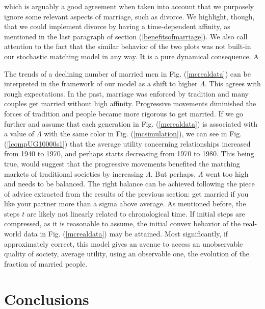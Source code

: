 \documentclass[12pt]{article}
\begin{document}
\noindent which is arguably a good agreement when taken into account that we purposely ignore some relevant aspects of marriage, such as divorce. We highlight, though, that we could implement divorce by having a time-dependent affinity, as mentioned in the last paragraph of section (\ref{benefitsofmarriage}). We also call attention to the fact that the similar behavior of the two plots was not built-in our stochastic matching model in any way. It is a pure dynamical consequence. A

The trends of a declining number of married men in Fig. (\ref{mcrealdata}) can be interpreted in the framework of our model as a shift to higher $\Lambda$. This agrees with rough expectations. In the past, marriage was enforced by tradition and many couples get married without high affinity. Progressive movements diminished the forces of tradition and people became more rigorous to get married. If we go further and assume that each generation in Fig. (\ref{mcrealdata}) is associated with a value of $\Lambda$ with the same color in Fig. (\ref{mcsimulation}), we can see in Fig. (\ref{lcompUG10000s1}) that the average utility concerning relationships increased from 1940 to 1970, and perhaps starts decreasing from 1970 to 1980. This being true, would suggest that the progressive movements benefited the matching markets of traditional societies by increasing $\Lambda$. But perhaps, $\Lambda$ went too high and needs to be balanced. The right balance can be achieved following the piece of advice extracted from the results of the previous section: get married if you like your partner more than a sigma above average. As mentioned before, the steps $t$ are likely not linearly related to chronological time. If initial steps are compressed, as it is reasonable to assume, the initial convex behavior of the real-world data in Fig. (\ref{mcrealdata}) may be attained. Most significantly, if approximately correct, this model gives an avenue to access an unobservable quality of society, average utility, using an observable one, the evolution of the fraction of married people.

\section{Conclusions}
\end{document}
